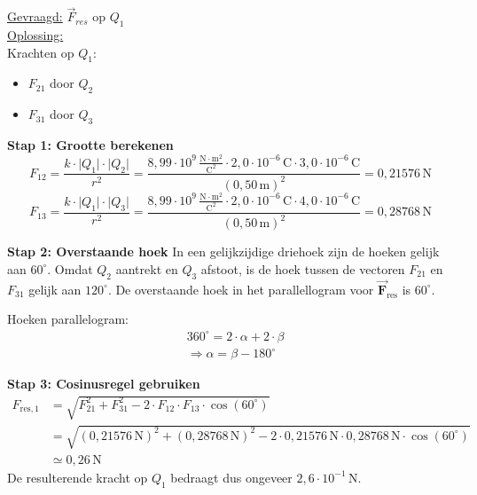 \documentclass{ximera}
\begin{document}
\begin{exercise}
\begin{solution}
        \underline{Gevraagd:} $\vec{F}_{res}$ op $Q_{1}$ \\

        \underline{Oplossing:}\\
        Krachten op $Q_{1}$:  
        \begin{itemize}
            \item $F_{21}$ door $Q_{2}$  
            \item $F_{31}$ door $Q_{3}$  
        \end{itemize}

        \textbf{Stap 1: Grootte berekenen}  
        \[
            F_{12} = \frac{k \cdot \lvert Q_{1}\rvert \cdot\lvert Q_{2}\rvert}{r^{2}} = 
            \frac{8{,}99 \cdot 10^9 \, \mathrm{\frac{N \cdot m^2}{C^2}} \cdot 2{,}0 \cdot 10^{-6} \, \mathrm{C} \cdot 3{,}0 \cdot 10^{-6} \, \mathrm{C}}{(0{,}50 \, \mathrm{m})^{2}} 
            = 0{,}21576 \, \mathrm{N}
        \]
        \[
            F_{13} = \frac{k \cdot \lvert Q_{1}\rvert \cdot \lvert Q_{3}\rvert}{r^{2}} = 
            \frac{8{,}99 \cdot 10^9 \, \mathrm{\frac{N \cdot m^2}{C^2}} \cdot 2{,}0 \cdot 10^{-6} \, \mathrm{C} \cdot 4{,}0 \cdot 10^{-6} \, \mathrm{C}}{(0{,}50 \, \mathrm{m})^{2}} 
            = 0{,}28768 \, \mathrm{N}
        \]

        \textbf{Stap 2: Overstaande hoek}  
        In een gelijkzijdige driehoek zijn de hoeken gelijk aan $60^\circ$. Omdat $Q_2$ aantrekt en $Q_3$ afstoot, is de hoek tussen de vectoren $F_{21}$ en $F_{31}$ gelijk aan $120^\circ$. De overstaande hoek in het parallellogram voor $\vec{\mathbf{F}}_{\text{res}}$ is $60^\circ$.
        \begin{hint}
            Hoeken parallelogram:
                \begin{align*}
                    &360^\circ=2\cdot\alpha+2\cdot\beta\\
                    &\Rightarrow \alpha = \beta - 180^\circ
                \end{align*}
        \end{hint}
        \textbf{Stap 3: Cosinusregel gebruiken}  
        \begin{align*}
            F_{\text{res},1} &= \sqrt{F_{21}^{2} + F_{31}^{2} - 2 \cdot F_{12} \cdot F_{13}\cdot \cos(60^\circ)}\\
            &= \sqrt{(0{,}21576 \, \mathrm{N})^{2}+(0{,}28768 \, \mathrm{N})^{2}-2\cdot 0{,}21576 \, \mathrm{N} \cdot 0{,}28768 \, \mathrm{N} \cdot \cos(60^\circ)}\\
            &\simeq 0{,}26 \, \mathrm{N}
        \end{align*}
        De resulterende kracht op $Q_{1}$ bedraagt dus ongeveer $2{,}6 \cdot 10^{-1} \, \mathrm{N}$.
    \end{solution}
\end{exercise}
\end{document}
